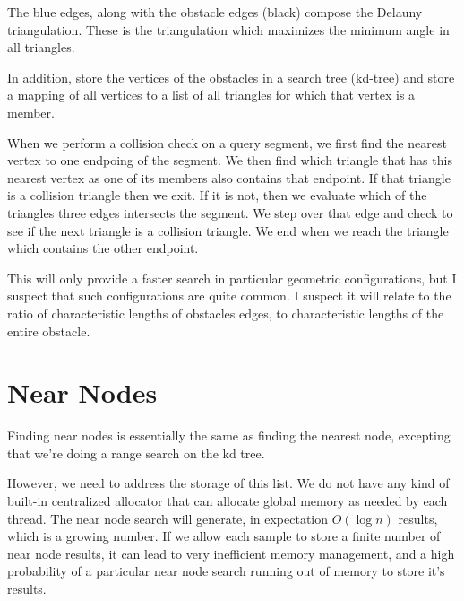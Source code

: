 \begin{figure}[H]
\begin{centering}
    \texttt{[image: \\figfile\{fig/delauny\_collision]}}
    \caption{Delauny Triangulation}
    \label{fig:delauny}
\end{centering} 
\end{figure}

The blue edges, along with the obstacle edges (black) compose the Delauny triangulation. These is the triangulation which maximizes the minimum angle in all triangles. 

In addition, store the vertices of the obstacles in a search tree (kd-tree) and store a mapping of all vertices to a list of all triangles for which that vertex is a member. 

When we perform a collision check on a query segment, we first find the nearest vertex to one endpoing of the segment. We then find which triangle that has this nearest vertex as one of its members also contains that endpoint. If that triangle is a collision triangle then we exit. If it is not, then we evaluate which of the triangles three edges intersects the segment. We step over that edge and check to see if the next triangle is a collision triangle. We end when we reach the triangle which contains the other endpoint. 

This will only provide a faster search in particular geometric configurations, but I suspect that such configurations are quite common. I suspect it will relate to the ratio of characteristic lengths of obstacles edges, to characteristic lengths of the entire obstacle. 
 

\section{Near Nodes}
\label{a:NearNodes}
Finding near nodes is essentially the same as finding the nearest node, excepting that we're doing a range search on the kd tree. 

However, we need to address the storage of this list. We do not have any kind of built-in centralized allocator that can allocate global memory as needed by each thread. The near node search will generate, in expectation $O(\log n)$ results, which is a growing number. If we allow each sample to store a finite number of near node results, it can lead to very inefficient memory management, and a high probability of a particular near node search running out of memory to store it's results. 

